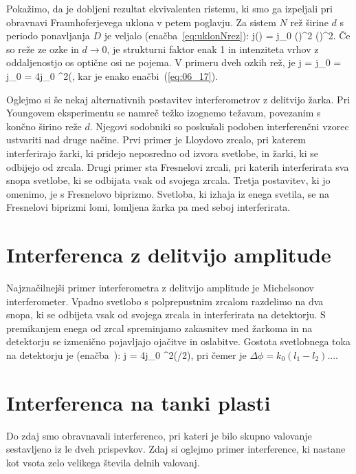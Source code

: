 Pokažimo, da je dobljeni rezultat ekvivalenten ristemu, ki smo ga izpeljali pri
obravnavi Fraunhoferjevega uklona v petem poglavju. Za sistem $N$ rež širine $d$
s periodo ponavljanja $D$ je veljalo (enačba~\ref{eq:uklonNrez}):
\beq
j(\vartheta) = j_0 \left(\right)^2
\left(\right)^2\!\!.
\label{eq:06_22}
\eeq
Če so reže ze ozke in $d\to 0$, je strukturni faktor enak 1 in intenziteta vrhov z oddaljenostjo
os optične osi ne pojema. V primeru dveh ozkih rež, je 
\beq
j = j_0  = 
j_0 
 = 4j_0 \cos^2\left(,
\label{eq:06_23}
\eeq
kar je enako enačbi~(\ref{eq:06_17}).

\begin{remark}
Oglejmo si še nekaj alternativnih postavitev interferometrov z delitvijo žarka. Pri Youngovem
eksperimentu se namreč težko izognemo težavam, povezanim s končno širino reže $d$. Njegovi
sodobniki so poskušali podoben interferenčni vzorec ustvariti nad druge načine. Prvi primer
je Lloydovo zrcalo, pri katerem interferirajo žarki, ki pridejo neposredno od izvora svetlobe, 
in žarki, ki se odbijejo od zrcala. Drugi primer sta Fresnelovi zrcali, pri katerih interferirata
sva snopa svetlobe, ki se odbijata vsak od svojega zrcala. Tretja postavitev, ki jo omenimo,
je s Fresnelovo biprizmo. Svetloba, ki izhaja iz enega svetila, se na Fresnelovi biprizmi
lomi, lomljena žarka pa med seboj interferirata.
\end{remark}

\section{Interferenca z delitvijo amplitude}
Najznačilnejši primer interferometra z delitvijo amplitude je Michelsonov interferometer.
Vpadno svetlobo s polprepustnim zrcalom razdelimo na dva snopa, ki se odbijeta vsak od 
svojega zrcala in interferirata na detektorju. S premikanjem enega od zrcal spreminjamo
zakasnitev med žarkoma in na detektorju se izmenično pojavljajo ojačitve in oslabitve.
Gostota svetlobnega toka na detektorju je (enačba~):
\beq
j = 4j_0 \cos^2(\Delta \phi/2),
\label{eq:06_24}
\eeq
pri čemer je $\Delta \phi = k_0(l_1-l_2)$....


\section{Interferenca na tanki plasti}
Do zdaj smo obravnavali interferenco, pri kateri je bilo skupno valovanje sestavljeno iz le 
dveh prispevkov. Zdaj si oglejmo primer interference, ki nastane kot vsota zelo velikega 
števila delnih valovanj. 

